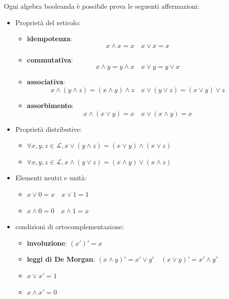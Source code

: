 \begin{teorema}
    Ogni algebra booleanda è possibile prova le  seguenti affermazioni:
    \begin{itemize}
        \item Proprietà del reticolo:
        \begin{itemize}
            \item \textbf{idempotenza}:
            $$x\land x = x \quad x\lor x = x$$ 
            \item \textbf{commutativa}:
            $$x\land y = y\land x \quad x\lor y = y\lor x$$ 
            \item \textbf{associativa}:
            $$x\land (y \land z) = (x \land y)\land z \quad x\lor (y \lor z) =( x\lor y)\lor z$$ 
            \item \textbf{assorbimento}:
            $$x\land (x \lor y) =x\quad x\lor (x \land y) =x$$  
        \end{itemize} 
        \item Proprietà distributive:
        \begin{itemize}
            \item $\forall x,y,z\in \mathcal{L}, x\lor (y\land z)= (x\lor y) \land (x\lor z)$
            \item $\forall x,y,z\in \mathcal{L}, x\land (y\lor z)= (x\land y) \lor (x\land z)$
        \end{itemize}
        \item Elementi neutri e unità:
        \begin{itemize}
            \item $x\lor 0 = x\quad x\lor 1 = 1$
            \item $x\land 0 = 0\quad x\land 1 =x$
        \end{itemize}
        \item condizioni di ortocomplementazione:
        \begin{itemize}
            \item \textbf{involuzione}: $(x')'= x$
            \item \textbf{leggi di De Morgan}: $(x\land y)' = x'\lor y' \quad (x\lor y)' = x'\land y'$
            \item $x\lor x' = 1$
            \item $x\land x' = 0$
        \end{itemize}

    \end{itemize}
\end{teorema}

